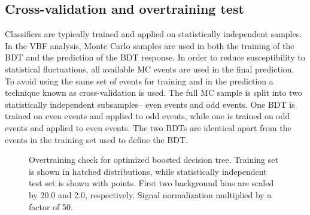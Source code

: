 \subsection{Cross-validation and overtraining test}

Classifiers are typically trained and applied on statistically
independent samples. In the VBF analysis, Monte Carlo samples are used
in both the training of the BDT and the prediction of the BDT
response. In order to reduce susceptibility to statistical
fluctuations, all available MC events are used in the final
prediction. To avoid using the same set of events for training and in
the prediction a technique known as cross-validation is used. The full
MC sample is split into two statistically independent subsamples--
even events and odd events. One BDT is trained on even events and
applied to odd events, while one is trained on odd events and applied
to even events. The two BDTs are identical apart from the events in
the training set used to define the BDT. 

\begin{figure}[h]
    \centering
    \caption[Boosted decision tree overtraining check.]{Overtraining
      check for optimized boosted decision tree. Training set is shown
    in hatched distributions, while statistically independent test set
    is shown with points. First two background bins are scaled by 20.0
    and 2.0, respectively. Signal normalization multiplied by a factor
    of 50.}
\label{chap:bdt:fig:overtraining}
\end{figure}
